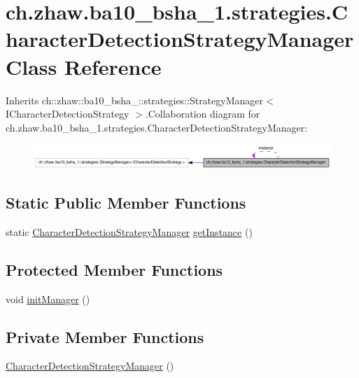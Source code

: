 \hypertarget{classch_1_1zhaw_1_1ba10__bsha__1_1_1strategies_1_1CharacterDetectionStrategyManager}{
\section{ch.zhaw.ba10\_\-bsha\_\-1.strategies.CharacterDetectionStrategyManager Class Reference}
\label{classch_1_1zhaw_1_1ba10__bsha__1_1_1strategies_1_1CharacterDetectionStrategyManager}
}


Inherits ch::zhaw::ba10\_\-bsha\_::strategies::StrategyManager$<$ ICharacterDetectionStrategy $>$.Collaboration diagram for ch.zhaw.ba10\_\-bsha\_\-1.strategies.CharacterDetectionStrategyManager:\nopagebreak
\begin{figure}[H]
\begin{center}
\leavevmode
\includegraphics[width=400pt]{classch_1_1zhaw_1_1ba10__bsha__1_1_1strategies_1_1CharacterDetectionStrategyManager__coll__graph}
\end{center}
\end{figure}
\subsection*{Static Public Member Functions}
\begin{DoxyCompactItemize}
\item 
static \hyperlink{classch_1_1zhaw_1_1ba10__bsha__1_1_1strategies_1_1CharacterDetectionStrategyManager}{CharacterDetectionStrategyManager} \hyperlink{classch_1_1zhaw_1_1ba10__bsha__1_1_1strategies_1_1CharacterDetectionStrategyManager_a380560b40e543ce6b16f7537874e8617}{getInstance} ()
\end{DoxyCompactItemize}
\subsection*{Protected Member Functions}
\begin{DoxyCompactItemize}
\item 
void \hyperlink{classch_1_1zhaw_1_1ba10__bsha__1_1_1strategies_1_1CharacterDetectionStrategyManager_a5a77dec09ef522e5e547377159de89ef}{initManager} ()
\end{DoxyCompactItemize}
\subsection*{Private Member Functions}
\begin{DoxyCompactItemize}
\item 
\hyperlink{classch_1_1zhaw_1_1ba10__bsha__1_1_1strategies_1_1CharacterDetectionStrategyManager_a3a9f72e8aa13f48ec368c05569be8d69}{CharacterDetectionStrategyManager} ()
\end{DoxyCompactItemize}
